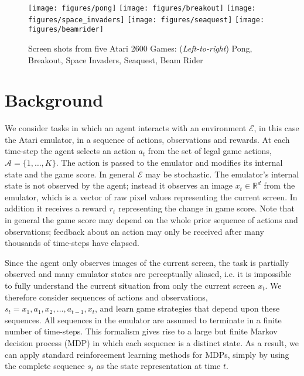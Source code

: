 \documentclass{article} \usepackage{nips13submit_e,times}
\begin{document}
\begin{figure}
\texttt{[image: figures/pong]}
\texttt{[image: figures/breakout]}
\texttt{[image: figures/space\_invaders]}
\texttt{[image: figures/seaquest]}
\texttt{[image: figures/beamrider]}
\caption{\label{fig-games} Screen shots from five Atari 2600 Games: (\emph{Left-to-right}) Pong, Breakout, Space Invaders, Seaquest, Beam Rider}
\end{figure}


























 
\section{Background}
\label{sec:background}


We consider tasks in which an agent interacts with an environment $\mathcal{E}$, in this case the Atari emulator, in a sequence of actions, observations and rewards. 
At each time-step the agent selects an action $a_t$ from the set of legal game actions, $\mathcal{A}=\{1, \ldots, K \}$. The action is passed to the emulator and modifies its internal state and the game score. In general $\mathcal{E}$ may be stochastic. The emulator's internal state is not observed by the agent; instead it observes an image $x_t \in \mathbb{R}^d$ from the emulator, which is a vector of raw pixel values representing the current screen. In addition it receives a reward $r_t$ representing the change in game score. Note that in general the game score may depend on the whole prior sequence of actions and observations; feedback about an action may only be received after many thousands of time-steps have elapsed. 

Since the agent only observes images of the current screen, the task is partially observed and many emulator states are perceptually aliased, i.e. it is impossible to fully understand the current situation from only the current screen $x_t$. We therefore consider sequences of actions and observations, $s_t = {x_1, a_1, x_2, ..., a_{t-1}, x_t}$, and learn game strategies that depend upon these sequences. All sequences in the emulator are assumed to terminate in a finite number of time-steps. This formalism gives rise to a large but finite Markov decision process (MDP) in which each sequence is a distinct state. As a result, we can apply standard reinforcement learning methods for MDPs, simply by using the complete sequence $s_t$ as the state representation at time $t$.
\end{document}
